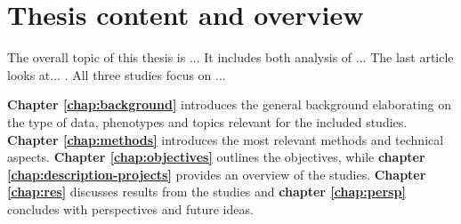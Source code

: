 \chapter*{Thesis content and overview}
\label{thesis-content-and-overview}

The overall topic of this thesis is ... It includes both analysis of ...
The last article looks at... . All
three studies focus on ...

\textbf{Chapter \ref{chap:background}} introduces the general background elaborating on the
type of data, phenotypes and topics relevant for the included studies.
\textbf{Chapter \ref{chap:methods}} introduces the most relevant methods and technical
aspects. \textbf{Chapter \ref{chap:objectives}} outlines the objectives, while
\textbf{chapter \ref{chap:description-projects}} provides an overview of the studies. \textbf{Chapter
\ref{chap:res}} discusses results from the studies and \textbf{chapter \ref{chap:persp}} concludes
with perspectives and future ideas.